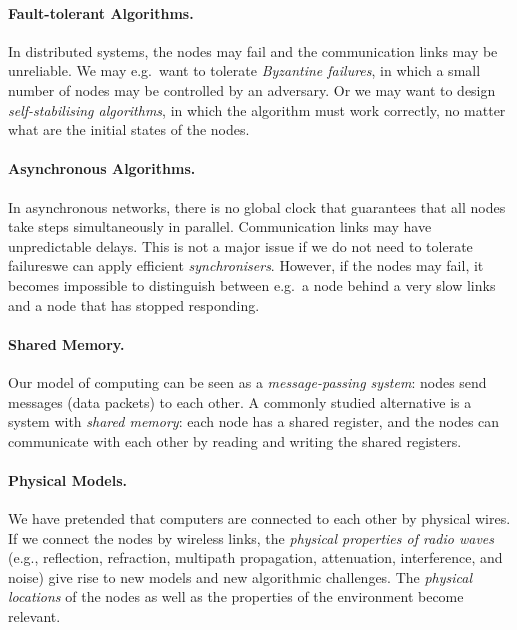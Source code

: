 \paragraph{Fault-tolerant Algorithms.}

In distributed systems, the nodes may fail and the communication links may be unreliable. We may e.g.\ want to tolerate \emph{Byzantine failures}, in which a small number of nodes may be controlled by an adversary. Or we may want to design \emph{self-stabilising algorithms}, in which the algorithm must work correctly, no matter what are the initial states of the nodes.


\paragraph{Asynchronous Algorithms.}

In asynchronous networks, there is no global clock that guarantees that all nodes take steps simultaneously in parallel. Communication links may have unpredictable delays. This is not a major issue if we do not need to tolerate failures\mydash we can apply efficient \emph{synchronisers}. However, if the nodes may fail, it becomes impossible to distinguish between e.g.\ a node behind a very slow links and a node that has stopped responding.


\paragraph{Shared Memory.}

Our model of computing can be seen as a \emph{message-passing system}: nodes send messages (data packets) to each other. A commonly studied alternative is a system with \emph{shared memory}: each node has a shared register, and the nodes can communicate with each other by reading and writing the shared registers.


\paragraph{Physical Models.}

We have pretended that computers are connected to each other by physical wires. If we connect the nodes by wireless links, the \emph{physical properties of radio waves} (e.g., reflection, refraction, multipath propagation, attenuation, interference, and noise) give rise to new models and new algorithmic challenges. The \emph{physical locations} of the nodes as well as the properties of the environment become relevant.


